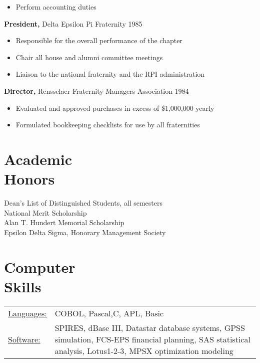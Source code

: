 \documentclass[margin]{res}
\begin{document}
\begin{resume}
\begin{itemize}
                \item  Perform accounting duties 

		 \end{itemize}

		{\bf President,} Delta Epsilon Pi Fraternity \hfill   1985 
                \begin{itemize} \itemsep -2pt
                 \item  Responsible for the overall performance of the 
                 chapter 
                
                 \item Chair all house and alumni committee meetings 
                
                 \item Liaison to the national fraternity and the RPI 
                 administration 
		 \end{itemize}

                  {\bf  Director,}  Rensselaer Fraternity Managers 
              Association     \hfill                                 1984 
                 \begin{itemize} \itemsep -2pt

               \item    Evaluated and approved purchases in excess of 
                 {\$}1,000,000 yearly 
                 
               \item  Formulated bookkeeping checklists for use by all 
                 fraternities 
		 \end{itemize}

\section{Academic \\ Honors} 
Dean's List of Distinguished Students, all semesters \\
National Merit Scholarship \\
Alan T. Hundert Memorial Scholarship \\
 Epsilon Delta Sigma, Honorary Management Society 
 

\section{Computer \\ Skills}
   \begin{tabular}{l p{3in}}
    \underline{Languages:} & COBOL, Pascal,C, APL, Basic \\

     \underline{Software:} &  SPIRES, dBase III, Datastar database 
                        systems, GPSS simulation, FCS-EPS financial 
                        planning, SAS statistical analysis, 
                        Lotus1-2-3, MPSX optimization modeling 
 \end{tabular}

\end{resume} 
\end{document}

